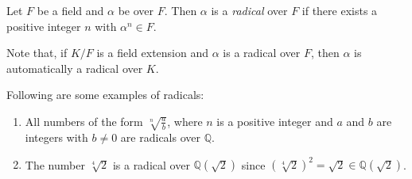 \documentclass[12pt]{article}
\begin{document}
Let $F$ be a field and $\alpha$ be  over $F$.  Then $\alpha$ is a \emph{radical} over $F$ if there exists a positive integer $n$ with $\alpha^n \in F$.

Note that, if $K/F$ is a field extension and $\alpha$ is a radical over $F$, then $\alpha$ is automatically a radical over $K$.

Following are some examples of radicals:

\begin{enumerate}

\item All numbers of the form $\displaystyle \sqrt[n]{\frac{a}{b}}$, where $n$ is a positive integer and $a$ and $b$ are integers with $b \neq 0$ are radicals over $\mathbb{Q}$.

\item The number $\sqrt[4]{2}$ is a radical over $\mathbb{Q}(\sqrt{2})$ since $(\sqrt[4]{2})^2=\sqrt{2} \in \mathbb{Q}(\sqrt{2})$.

\end{enumerate}
\end{document}

